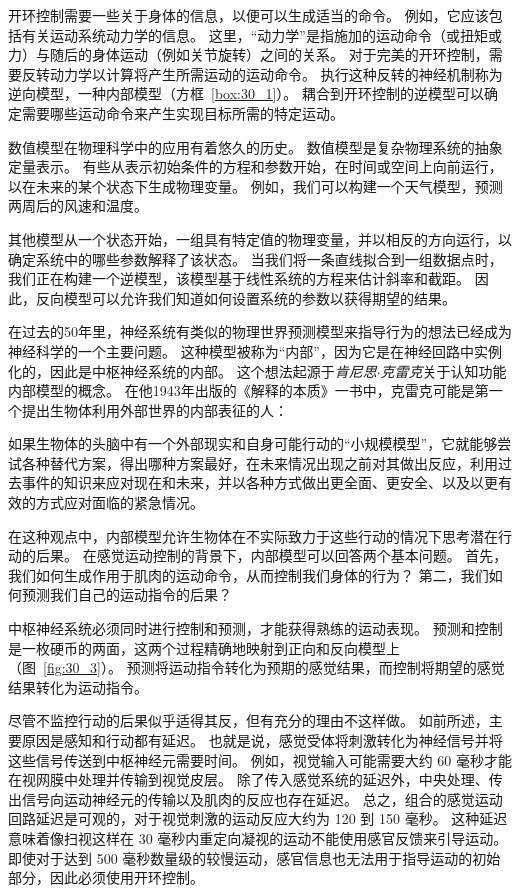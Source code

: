 开环控制需要一些关于身体的信息，以便可以生成适当的命令。
例如，它应该包括有关运动系统动力学的信息。
这里，“动力学”是指施加的运动命令（或扭矩或力）与随后的身体运动（例如关节旋转）之间的关系。
对于完美的开环控制，需要反转动力学以计算将产生所需运动的运动命令。
执行这种反转的神经机制称为逆向模型，一种内部模型（方框~\ref{box:30_1}）。
耦合到开环控制的逆模型可以确定需要哪些运动命令来产生实现目标所需的特定运动。


\begin{proposition}[内部模型] \label{box:30_1}
	
	\quad \quad 数值模型在物理科学中的应用有着悠久的历史。
	数值模型是复杂物理系统的抽象定量表示。
	有些从表示初始条件的方程和参数开始，在时间或空间上向前运行，以在未来的某个状态下生成物理变量。
	例如，我们可以构建一个天气模型，预测两周后的风速和温度。
	
	\quad \quad 其他模型从一个状态开始，一组具有特定值的物理变量，并以相反的方向运行，以确定系统中的哪些参数解释了该状态。
	当我们将一条直线拟合到一组数据点时，我们正在构建一个逆模型，该模型基于线性系统的方程来估计斜率和截距。
	因此，反向模型可以允许我们知道如何设置系统的参数以获得期望的结果。
	
	\quad \quad 在过去的50年里，神经系统有类似的物理世界预测模型来指导行为的想法已经成为神经科学的一个主要问题。
	这种模型被称为“内部”，因为它是在神经回路中实例化的，因此是中枢神经系统的内部。
	这个想法起源于\textit{肯尼思$\cdot$克雷克}关于认知功能内部模型的概念。
	在他1943年出版的《解释的本质》一书中，克雷克可能是第一个提出生物体利用外部世界的内部表征的人：
	
	\quad \quad 如果生物体的头脑中有一个外部现实和自身可能行动的“小规模模型”，它就能够尝试各种替代方案，得出哪种方案最好，在未来情况出现之前对其做出反应，利用过去事件的知识来应对现在和未来，并以各种方式做出更全面、更安全、以及以更有效的方式应对面临的紧急情况。
	
	\quad \quad 在这种观点中，内部模型允许生物体在不实际致力于这些行动的情况下思考潜在行动的后果。
	在感觉运动控制的背景下，内部模型可以回答两个基本问题。
	首先，我们如何生成作用于肌肉的运动命令，从而控制我们身体的行为？
	第二，我们如何预测我们自己的运动指令的后果？
	
	\quad \quad 中枢神经系统必须同时进行控制和预测，才能获得熟练的运动表现。
	预测和控制是一枚硬币的两面，这两个过程精确地映射到正向和反向模型上（图~\ref{fig:30_3}）。
	预测将运动指令转化为预期的感觉结果，而控制将期望的感觉结果转化为运动指令。
	
\end{proposition}


尽管不监控行动的后果似乎适得其反，但有充分的理由不这样做。
如前所述，主要原因是感知和行动都有延迟。
也就是说，感觉受体将刺激转化为神经信号并将这些信号传送到中枢神经元需要时间。
例如，视觉输入可能需要大约 60 毫秒才能在视网膜中处理并传输到视觉皮层。
除了传入感觉系统的延迟外，中央处理、传出信号向运动神经元的传输以及肌肉的反应也存在延迟。
总之，组合的感觉运动回路延迟是可观的，对于视觉刺激的运动反应大约为 120 到 150 毫秒。
这种延迟意味着像扫视这样在 30 毫秒内重定向凝视的运动不能使用感官反馈来引导运动。
即使对于达到 500 毫秒数量级的较慢运动，感官信息也无法用于指导运动的初始部分，因此必须使用开环控制。


